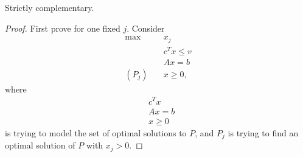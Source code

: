 \begin{prev}
	Strictly complementary.
\end{prev}

\begin{proof}
	First prove for one fixed \(j\). Consider
	\begin{align*}
		\max~        & x_{j}         \\
		             & c^{T}x \leq v \\
		             & Ax = b        \\
		(P_{j})\quad & x\geq 0,
	\end{align*}
	where
	\begin{align*}
		 & c^Tx    \\
		 & Ax = b  \\
		 & x\geq 0
	\end{align*}
	is trying to model the set of optimal solutions to \(P\), and \(P_{j}\) is trying to find an optimal solution of
	\(P\) with \(x_{j}>0\).


\end{proof}
